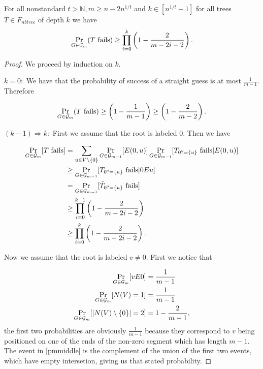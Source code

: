 \begin{lemm}
For all nonstandard $t>\mathbb{N},m\geq n-2n^{1/t}$ and $k\in [n^{1/t}+1]$ for all trees $T\in F_{nbtree}$ of depth $k$ we have
\[
\Pr_{G\in\mathcal{G}_m}(\text{$T$ fails})\geq \prod_{i=0}^k\left (1-\frac{2}{m-2i-2}\right ).
\]
\end{lemm}
\begin{proof}
We proceed by induction on $k$. 

$k=0:$ We have that the probability of success of a straight guess is at most $\frac{1}{m-1}$. Therefore

\begin{align}
\Pr_{G\in\mathcal{G}_m}(\text{$T$ fails})\geq \left (1-\frac{1}{m-1}\right ) \geq \left(1-\frac{2}{m-2}\right).
\end{align}

$(k-1) \Rightarrow k:$ First we assume that the root is labeled $0$. Then we have 

\begin{align}
\Pr_{G\in\mathcal{G}_m}[\text{$T$ fails}]&=\sum_{u\in V\setminus\{0\}}\Pr_{G\in\mathcal{G}_{m-1}}[E(0,u)]\Pr_{G\in\mathcal{G}_{m-1}}[T_{0?=\{u\}}\text{ fails}|E(0,u)]\\
&\geq \Pr_{G\in\mathcal{G}_{m-1}}[T_{0?=\{u\}}\text{ fails}|0Eu]\\
&= \Pr_{G\in\mathcal{G}_{m-1}}[\tilde T_{0?=\{u\}}\text{ fails}]\\
&\geq \prod_{i=0}^{k-1}\left(1-\frac{2}{m-2i-2}\right)\\
&\geq \prod_{i=0}^{k}\left(1-\frac{2}{m-2i-2}\right).
\end{align}

Now we assume that the root is labeled $v\not= 0$. First we notice that

\begin{align}
\Pr_{G\in\mathcal{G}_m}[vE0]&=\frac{1}{m-1}\\
\Pr_{G\in\mathcal{G}_m}[N(V)=1]&=\frac{1}{m-1}\\
\Pr_{G\in\mathcal{G}_m}[\left|{N(V)\setminus\{0\}}\right|=2]&=1-\frac{2}{m-1},\label{pmmiddle}
\end{align}
the first two probabilities are obviously $\frac{1}{m-1}$ because they correspond to $v$ being positioned on one of the ends of the non-zero segment which has length $m-1$. The event in \eqref{pmmiddle} is the complement of the union of the first two events, which have empty intersetion, giving us that stated probability.


\end{proof}
